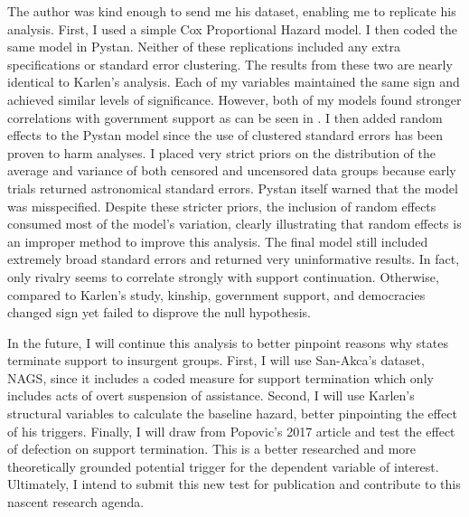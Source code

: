 \documentclass[12pt, a4paper]{article}
\begin{document}
The author was kind enough to send me his dataset, enabling me to replicate his analysis. First, I used a simple Cox Proportional Hazard model. I then coded the same model in Pystan. Neither of these replications included any extra specifications or standard error clustering.  The results from these two are nearly identical to Karlen's analysis. Each of my variables maintained the same sign and achieved similar levels of significance. However, both of my models found stronger correlations with government support as can be seen in . I then added random effects to the Pystan model since the use of clustered standard errors has been proven to harm analyses.\autocite{King2015} I placed very strict priors on the distribution of the average and variance of both censored and uncensored data groups because early trials returned astronomical standard errors. Pystan itself warned that the model was misspecified. Despite these stricter priors, the inclusion of random effects consumed most of the model's variation, clearly illustrating that random effects is an improper method to improve this analysis. The final model still included extremely broad standard errors and returned very uninformative results. In fact, only rivalry seems to correlate strongly with support continuation. Otherwise, compared to Karlen's study, kinship, government support, and democracies changed sign yet failed to disprove the null hypothesis. 

In the future, I will continue this analysis to better pinpoint reasons why states terminate support to insurgent groups. First, I will use San-Akca's dataset, NAGS,\autocite{SanAkca2016} since it includes a coded measure for support termination which only includes acts of overt suspension of assistance. Second, I will use Karlen's structural variables to calculate the baseline hazard, better pinpointing the effect of his triggers. Finally, I will draw from Popovic's 2017 article and test the effect of defection on support termination.\autocite{Popovic2017} This is a better researched and more theoretically grounded potential trigger for the dependent variable of interest. Ultimately, I intend to submit this new test for publication and contribute to this nascent research agenda.

\newpage
\printbibliography
\end{document}
